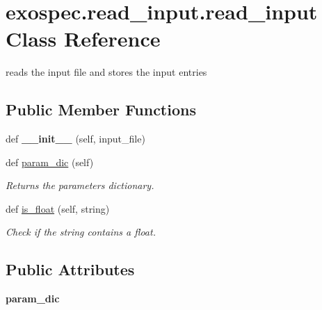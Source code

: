 \hypertarget{classexospec_1_1read__input_1_1read__input}{}\section{exospec.\+read\+\_\+input.\+read\+\_\+input Class Reference}
\label{classexospec_1_1read__input_1_1read__input}


reads the input file and stores the input entries  


\subsection*{Public Member Functions}
\begin{DoxyCompactItemize}
\item 
\mbox{\label{classexospec_1_1read__input_1_1read__input_a57a04569bc29445b8bd4f18502b150fe}} 
def {\bfseries \+\_\+\+\_\+init\+\_\+\+\_\+} (self, input\+\_\+file)
\item 
def \hyperlink{classexospec_1_1read__input_1_1read__input_a3b21e8723a95f914bb6c329ba68c3d86}{param\+\_\+dic} (self)
\begin{DoxyCompactList}\small\item\em Returns the parameters dictionary. \end{DoxyCompactList}\item 
\mbox{\label{classexospec_1_1read__input_1_1read__input_a79332c0dbddf207995b2ad5a602d97ce}} 
def \hyperlink{classexospec_1_1read__input_1_1read__input_a79332c0dbddf207995b2ad5a602d97ce}{is\+\_\+float} (self, string)
\begin{DoxyCompactList}\small\item\em Check if the string contains a float. \end{DoxyCompactList}\end{DoxyCompactItemize}
\subsection*{Public Attributes}
\begin{DoxyCompactItemize}
\item 
\mbox{\label{classexospec_1_1read__input_1_1read__input_a3f4c545f0ae322e1a7252a0bf66f3d9f}} 
{\bfseries param\+\_\+dic}
\end{DoxyCompactItemize}


